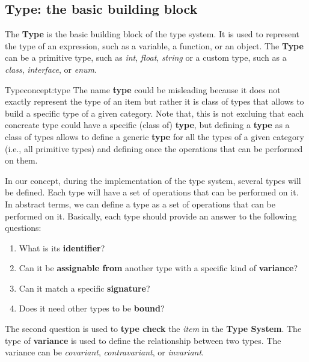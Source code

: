 \subsection{Type: the basic building block}\label{subsec:concept:typethebasicbuildingblock}

The \textbf{Type} is the basic building block of the type system. It is used to represent the type of an expression, such as a variable, a function, or an object. The \textbf{Type} can be a primitive type, such as \textit{int}, \textit{float}, \textit{string} or a custom type, such as a \textit{class}, \textit{interface}, or \textit{enum}.

\begin{mydefinition}{Type}{concept:type}
The name \textbf{type} could be misleading because it does not exactly represent the type of an item but rather it is class of types that allows to build a specific type of a given category. Note that, this is not excluing that each concreate type could have a specific (class of) \textbf{type}, but defining a \textbf{type} as a class of types allows to define a generic \textbf{type} for all the types of a given category (i.e., all primitive types) and defining once the operations that can be performed on them.
\end{mydefinition}

In our concept, during the implementation of the type system, several types will be defined. Each type will have a set of operations that can be performed on it. In abstract terms, we can define a type as a set of operations that can be performed on it.
Basically, each type should provide an answer to the following questions:
\begin{enumerate}
    \item What is its \textbf{identifier}?
    \item Can it be \textbf{assignable from} another type with a specific kind of \textbf{variance}?
    \item Can it match a specific \textbf{signature}?
    \item Does it need other types to be \textbf{bound}?
\end{enumerate}

The second question is used to \textbf{type check} the \textit{item} in the \textbf{Type System}. The type of \textbf{variance} is used to define the relationship between two types. The variance can be \textit{covariant}, \textit{contravariant}, or \textit{invariant}.

